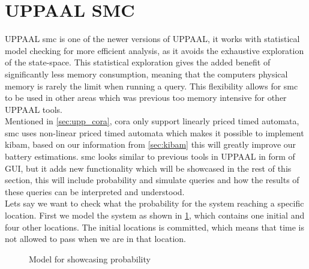 
\section{UPPAAL SMC}\label{sec:smc}
UPPAAL \gls{smc} is one of the newer versions of UPPAAL, it works with statistical model checking for more efficient analysis, as it avoids the exhaustive exploration of the state-space. This statistical exploration gives the added benefit of significantly less memory consumption, meaning that the computers physical memory is rarely the limit when running a query. This flexibility allows for \gls{smc} to be used in other areas which was previous too memory intensive for other UPPAAL tools\cite{cs_smc}. \\
Mentioned in \cref{sec:upp_cora}, \gls{cora} only support linearly priced timed automata, \gls{smc} uses non-linear priced timed automata which makes it possible to implement \gls{kibam}, based on our information from \cref{sec:kibam} this will greatly improve our battery estimations. \gls{smc} looks similar to previous tools in UPPAAL in form of GUI, but it adds new functionality which will be showcased in the rest of this section, this will include probability and simulate queries and how the results of these queries can be interpreted and understood. \\
Lets say we want to check what the probability for the system reaching a specific location. First we model the system as shown in \cref{fig:example}, which contains one initial and four other locations. The initial locations is committed, which means that time is not allowed to pass when we are in that location.

\begin{figure}
	\centering
	\caption{Model for showcasing probability}
	\label{fig:example}
\end{figure}

